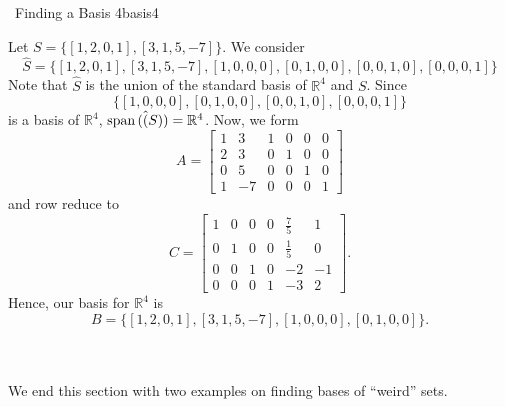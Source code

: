         \begin{example}{\Difficulty\,\Difficulty\,\,Finding a Basis 4}{basis4}

            Let \(S=\{[1,2,0,1],[3,1,5,-7]\}\). We consider 
            \begin{equation*}
                \hat{S}=\{[1,2,0,1],[3,1,5,-7],[1,0,0,0],[0,1,0,0],[0,0,1,0],[0,0,0,1]\}
            \end{equation*}
            Note that \(\hat{S}\) is the union of the standard basis of \(\mathbb{R}^4\) and \(S\). Since
            \begin{equation*}
                \{[1,0,0,0],[0,1,0,0],[0,0,1,0],[0,0,0,1]\}
            \end{equation*}
            is a basis of \(\mathbb{R}^4\), \(\text{span\,}(\hat(S))=\mathbb{R}^4\). Now, we form
            \begin{equation*}
                A=\begin{bmatrix}
                    1 & 3 & 1 & 0 & 0 & 0 \\
                    2 & 3 & 0 & 1 & 0 & 0 \\
                    0 & 5 & 0 & 0 & 1 & 0 \\
                    1 & -7 & 0 & 0 & 0 & 1
                \end{bmatrix}
            \end{equation*}
            and row reduce to
            \begin{equation*}
                C=\begin{bmatrix}
                    1 & 0 & 0 & 0 & \frac{7}{5} & 1 \\
                    0 & 1 & 0 & 0 & \frac{1}{5} & 0 \\
                    0 & 0 & 1 & 0 & -2 & -1 \\
                    0 & 0 & 0 & 1 & -3 & 2
                \end{bmatrix}.
            \end{equation*}
            Hence, our basis for \(\mathbb{R}^4\) is
            \begin{equation*}
                B=\{[1,2,0,1],[3,1,5,-7],[1,0,0,0],[0,1,0,0]\}.
            \end{equation*}
        \end{example}
        \pagebreak
        \vphantom
        \\
        \\
        We end this section with two examples on finding bases of ``weird'' sets.
